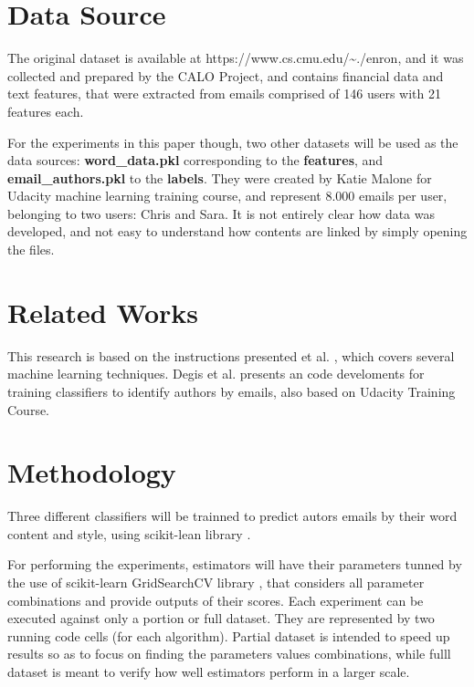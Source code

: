 \documentclass[11pt]{article}
\begin{document}
\begin{multicols}{2}
    \section{Data Source}\label{data-source}

The original dataset is available at
https://www.cs.cmu.edu/\textasciitilde{}./enron, and it was collected
and prepared by the CALO Project, and contains financial data and text
features, that were extracted from emails comprised of 146 users with 21
features each.

For the experiments in this paper though, two other datasets will be
used as the data sources: \textbf{word\_data.pkl} corresponding to the
\textbf{features}, and \textbf{email\_authors.pkl} to the
\textbf{labels}. They were created by Katie Malone for Udacity machine
learning training course, and represent 8.000 emails per user, belonging
to two users: Chris and Sara. It is not entirely clear how data was
developed, and not easy to understand how contents are linked by simply
opening the files.

    \section{Related Works}\label{related-works}

This research is based on the instructions presented et al.
\cite{Udacity}, which covers several machine learning techniques. Degis
et al. \cite{mdegis} presents an code develoments for training
classifiers to identify authors by emails, also based on Udacity
Training Course.

    \section{Methodology}\label{methodology}

Three different classifiers will be trainned to predict autors emails by
their word content and style, using scikit-lean library \cite{scikit}.

For performing the experiments, estimators will have their parameters
tunned by the use of scikit-learn GridSearchCV library \cite{gsearch},
that considers all parameter combinations and provide outputs of their
scores. Each experiment can be executed against only a portion or full
dataset. They are represented by two running code cells (for each
algorithm). Partial dataset is intended to speed up results so as to
focus on finding the parameters values combinations, while fulll dataset
is meant to verify how well estimators perform in a larger scale.


\end{multicols}
\end{document}
